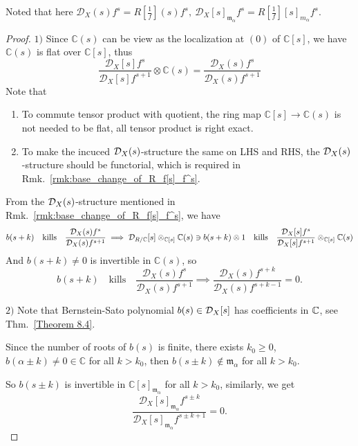 \begin{remark}\label{rmk:D_X(s)f^s=R_f(s)f^s_and_D_X[s]_m_alpha_f^s=R_f[s]_m_alpha_f^s}
    Noted that here  $\mathcal{D}_{X}(s) f^{s} = R[\frac{1}{f}](s) f^{s},\ \mathcal{D}_{X}[s]_{\mathfrak{m}_{\alpha}} f^{s} = R[\frac{1}{f}][s]_{m_{\alpha}} f^{s}$.
\end{remark}

\begin{proof}
    \mbox{}

    $1)$ Since $\mathbb{C}(s)$ can be view as the localization at $(0)$ of $\mathbb{C}[s]$,
    we have $\mathbb{C}(s)$ is flat over $\mathbb{C}[s]$,
    thus
    \[
        \frac{\mathcal{D}_{X}[s]f^{s}}{\mathcal{D}_{X}[s]f^{s+1}}\otimes \mathbb{C}(s)=\frac{\mathcal{D}_{X}(s)f^{s}}{\mathcal{D}_{X}(s)f^{s+1}}
    \]
    Note that
    \begin{enumerate}
        \item To commute tensor product with quotient, the ring map $\mathbb{C}[s]\to \mathbb{C}(s)$ is not needed to be flat, all tensor product is right exact.
        \item To make the incuced $\mathcal{D}_X(s)$-structure the same on LHS and RHS, the $\mathcal{D}_X(s)$-structure should be functorial, which is required in Rmk.~\ref{rmk:base_change_of_R_f[s]_f^s}.
    \end{enumerate}

    From the $\mathcal{D}_X(s)$-structure mentioned in Rmk.~\ref{rmk:base_change_of_R_f[s]_f^s}, we have
    \[
        b(s+k) \quad\mathrm{kills} \quad\frac{\mathcal{D}_{X}(s)f^{s}}{\mathcal{D}_{X}(s)f^{s+1}} \implies \mathcal{D}_{R/\mathbb{C}}[s]\otimes_{\mathbb{C}[s]} \mathbb{C}(s) \ni b(s+k)\otimes 1  \quad\mathrm{kills } \quad\frac{\mathcal{D}_{X}[s]f^{s}}{\mathcal{D}_{X}[s]f^{s+1}} \otimes_{\mathbb{C}[s]} \mathbb{C}(s)
    \]
    And $b(s+k) \neq 0$ is invertible in $\mathbb{C}(s)$, so
    \[
        b(s+k) \quad\mathrm{kills} \quad\frac{\mathcal{D}_{X}(s)f^{s}}{\mathcal{D}_{X}(s)f^{s+1}} \implies \frac{\mathcal{D}_X(s) f^{s+k}}{\mathcal{D}_X(s) f^{s+k-1}} = 0.
    \]

    $2)$  Note that Bernstein-Sato polynomial $b(s)\in\mathcal{D}_X[s]$ has coefficients in $\mathbb{C}$, see Thm.~\ref{Theorem 8.4}.

    Since the number of roots of $b(s)$ is finite,
    there exists $k_0 \ge 0$, $b(\alpha \pm k) \neq 0 \in\mathbb{C}$ for all $k > k_0$,
    then $b(s \pm k) \notin \mathfrak{m}_\alpha$ for all $k > k_0$.

    So $b(s \pm k)$ is invertible in $\mathbb{C}[s]_{\mathfrak{m}_\alpha}$ for all $k > k_0$,
    similarly, we get
    \[
        \frac{\mathcal{D}_X[s]_{\mathfrak{m}_\alpha} f^{s \pm k}}{\mathcal{D}_X[s]_{\mathfrak{m}_\alpha} f^{s \pm k + 1}} = 0.
    \]
\end{proof}

